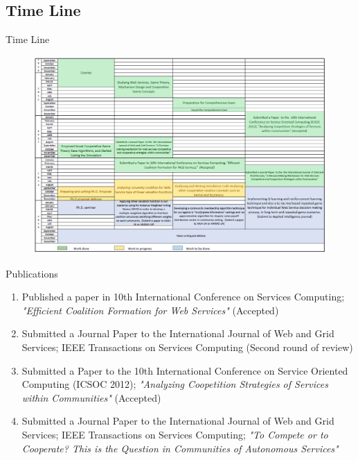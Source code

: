 \documentclass{beamer}
\begin{document}
\subsection{Time Line}
    \begin{frame}{Time Line}


\begin{figure}[htbp]
\begin{center}
\includegraphics[width=1 \columnwidth]{figures/timetable.png}
\end{center}
\end{figure}
    \end{frame}
\begin{frame}{Publications}

    \begin{enumerate}
        \item Published a paper in 10th International Conference on Services Computing; \emph{"Efficient Coalition Formation for Web Services"} {\color{blue} (Accepted)}
        \item Submitted a Journal Paper to the International Journal of Web and Grid Services; IEEE Transactions on Services Computing {\color{blue} (Second round of review)}
        \item Submitted a Paper to the 10th International Conference on Service Oriented Computing (ICSOC 2012); \emph{"Analyzing Coopetition Strategies of Services within Communities"} {\color{blue} (Accepted)}
        \item Submitted a Journal Paper to the International Journal of Web and Grid Services; IEEE Transactions on Services Computing; \emph{"To Compete or to Cooperate? This is the Question in Communities of Autonomous Services"}
    \end{enumerate}


\end{frame}
\end{document}

